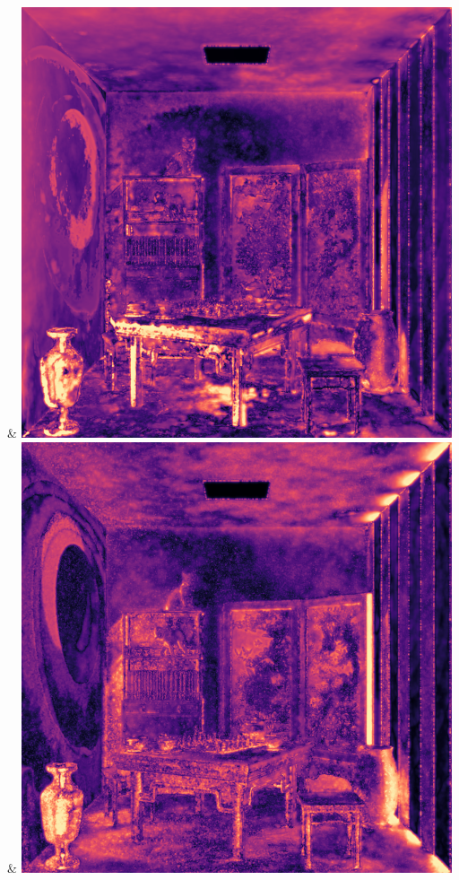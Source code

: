 & \includegraphics[width=\linewidth]{figures/py/tests/quality_comparison/nrc+pt+sl_1spp_chess_flip.png}
& \includegraphics[width=\linewidth]{figures/py/tests/quality_comparison/nrc+bt_1spp_chess_flip.png}
